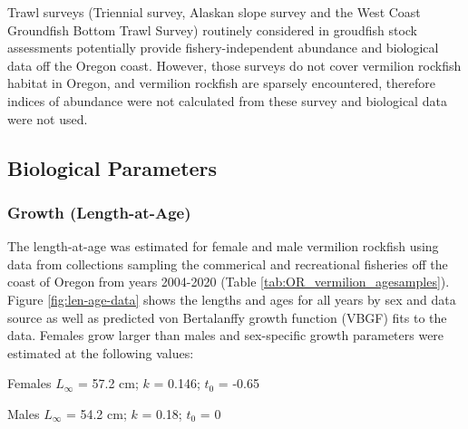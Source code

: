 \documentclass[11pt,
  english,
  a4paper,
]{article}
\begin{document}
Trawl surveys (Triennial survey, Alaskan slope survey and the West Coast Groundfish Bottom Trawl Survey) routinely considered in groudfish stock assessments potentially provide fishery-independent abundance and biological data off the Oregon coast. However, those surveys do not cover vermilion rockfish habitat in Oregon, and vermilion rockfish are sparsely encountered, therefore indices of abundance were not calculated from these survey and biological data were not used.

\leavevmode\tagmcend\tagstructend\par


\hypertarget{biological-parameters}{%
\subsection{Biological Parameters}\label{biological-parameters}}

\leavevmode\tagmcend\tagstructend


\hypertarget{growth-length-at-age}{%
\subsubsection{Growth (Length-at-Age)}\label{growth-length-at-age}}

\leavevmode\tagmcend\tagstructend


The length-at-age was estimated for female and male vermilion rockfish using data from collections sampling the commerical and recreational fisheries off the coast of Oregon from years 2004-2020 (Table \ref{tab:OR_vermilion_agesamples}). Figure \ref{fig:len-age-data} shows the lengths and ages for all years by sex and data source as well as predicted von Bertalanffy growth function (VBGF) fits to the data. Females grow larger than males and sex-specific growth parameters were estimated at the following values:

\leavevmode\tagmcend\tagstructend\par

\begin{centering}

Females $L_{\infty}$ = 57.2 cm; $k$ = 0.146; $t_0$ = -0.65

Males $L_{\infty}$ = 54.2 cm; $k$ = 0.18; $t_0$ = 0

\end{centering}
\end{document}
